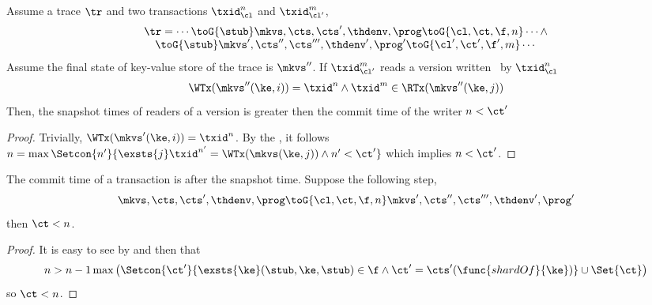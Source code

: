 \begin{lemma}
    \label{lem:clock-si-reader-greater-than-writer}
    Assume a trace \( \tr \) and two transactions \( \txid_{\cl}^n\) and \( \txid_{\cl'}^m \),
        \[
            \begin{array}{@{}l@{}}
                \tr = \cdots \toG{\stub} \mkvs,\cts,\cts',\thdenv, \prog \toG{\cl,\ct,\f,n} \cdots \land \\
                \quad \toG{\stub} \mkvs',\cts'',\cts''',\thdenv', \prog' \toG{\cl',\ct',\f',m} \cdots
            \end{array}
        \]
    Assume the final state of key-value store of the trace is \( \mkvs'' \).
    If  \( \txid_{\cl'}^m \) reads a version written \ by \( \txid_{\cl}^n\)
    \[
        \begin{array}{@{}l@{}}
            \WTx(\mkvs''(\ke,i)) = \txid^n 
            \land \txid^m \in \RTx(\mkvs''(\ke,j))
        \end{array}
    \]
    Then, the snapshot times of readers of a version is greater then the commit time of the writer \( n < \ct' \)
\end{lemma}
\begin{proof}
    Trivially, \( \WTx(\mkvs'(\ke,i)) = \txid^n \).
    By the , it follows \( n  = \max\Setcon{n'}{ \exsts{j} \txid^{n'} = \WTx(\mkvs(\ke, j)) \land n' < \ct' } \) which implies \( n < \ct' \).
\end{proof}


\begin{lemma}
    \label{lem:commit-after-snapshot-time}
    The commit time of a transaction is after the snapshot time.
    Suppose the following step,
    \[
        \mkvs,\cts,\cts',\thdenv, \prog \toG{\cl,\ct,\f,n} \mkvs',\cts'',\cts''',\thdenv', \prog'
    \]
    then \( \ct < n \).
\end{lemma}
\begin{proof}
    It is easy to see by  and then  that 
    \[
        n > n - 1 \max\left( \Setcon{\ct'}{\exsts{\ke} (\stub, \ke, \stub) \in \f \land \ct' = \cts'(\func{shardOf}{\ke})} \cup \Set{\ct} \right)
    \]
    so \( \ct < n \).
\end{proof}


